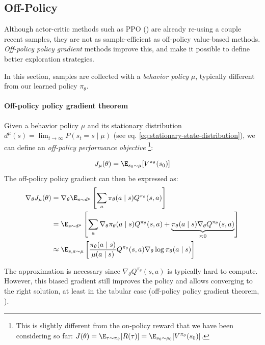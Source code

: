 \subsection{Off-Policy}
Although actor-critic methods such as PPO () are already re-using a couple recent samples, they are not as sample-efficient as off-policy value-based methods. \emph{Off-policy policy gradient} methods improve this, and make it possible to define better exploration strategies.

In this section, samples are collected with a \emph{behavior policy} $\mu$, typically different from our learned policy $\pi_\theta$.

\paragraph{Off-policy policy gradient theorem}
Given a behavior policy $\mu$ and its stationary distribution $d^\mu(s) = \lim_{t\rightarrow \infty} P(s_t = s \mid \mu)$ (see eq. \ref{eq:stationary-state-distribution}), we can define an \emph{off-policy performance objective} \footnote{
This is slightly different from the on-policy reward that we have been considering so far: $J(\theta) = \E_{\tau \sim \pi_\theta}[R(\tau)] = \E_{s_0 \sim \rho_0}[V^{\pi_\theta}(s_0)]$.
}:

\[
    J_\mu(\theta) = \E_{s_0 \sim \mu}[V^{\pi_\theta}(s_0)]
\]
The off-policy policy gradient can then be expressed as:
\begin{align}
    \nabla_\theta J_\mu(\theta)
    &= \nabla_\theta \E_{s\sim d^\mu} \left[ \sum_a \pi_\theta(a\mid s) Q^{\pi_\theta}(s,a) \right] \nonumber \\
    &= \E_{s\sim d^\mu} \left[ 
        \sum_a \nabla_\theta \pi_\theta(a\mid s) Q^{\pi_\theta}(s,a) + 
        \underbrace{\pi_\theta(a\mid s) \nabla_\theta Q^{\pi_\theta}(s,a)}_{\approx 0}
    \right] \nonumber \\
    &\approx \E_{s,a \sim \mu} \left[
        \frac{\pi_\theta(a\mid s)}{\mu(a\mid s)} Q^{\pi_\theta}(s,a) \nabla_\theta \log \pi_\theta(a\mid s)
    \right]
    \label{eq:off-policy-policy-gradient}
\end{align}

The approximation is necessary since $\nabla_\theta Q^{\pi_\theta}(s,a)$ is typically hard to compute. However, this biased gradient still improves the policy and allows converging to the right solution, at least in the tabular case (off-policy policy gradient theorem, \cite{degris2012off}).


